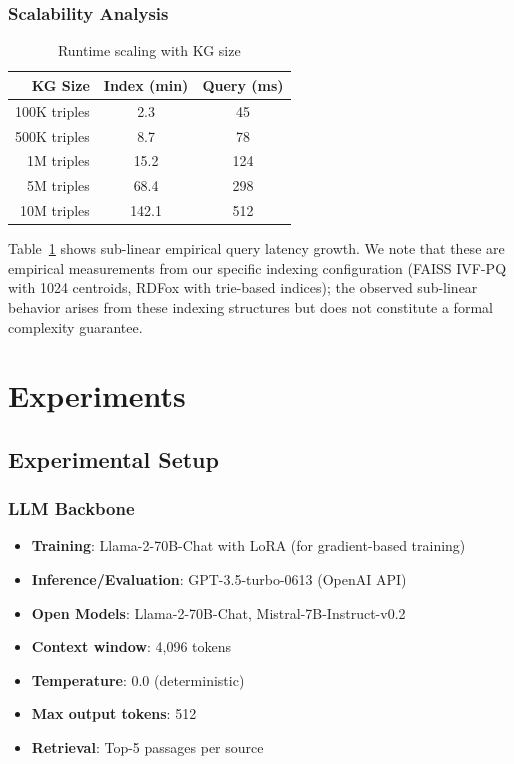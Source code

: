 \documentclass[10pt,twocolumn]{article}
\begin{document}
\subsubsection{Scalability Analysis}

\begin{table}[t]
\centering
\caption{Runtime scaling with KG size}
\label{tab:scale}
\small
\begin{tabular}{@{}rcc@{}}
\toprule
\textbf{KG Size} & \textbf{Index (min)} & \textbf{Query (ms)} \\
\midrule
100K triples & 2.3 & 45 \\
500K triples & 8.7 & 78 \\
1M triples & 15.2 & 124 \\
5M triples & 68.4 & 298 \\
10M triples & 142.1 & 512 \\
\bottomrule
\end{tabular}
\end{table}

Table~\ref{tab:scale} shows sub-linear empirical query latency growth. We note that these are empirical measurements from our specific indexing configuration (FAISS IVF-PQ with 1024 centroids, RDFox with trie-based indices); the observed sub-linear behavior arises from these indexing structures but does not constitute a formal complexity guarantee.

\section{Experiments}
\label{sec:experiments}

\subsection{Experimental Setup}

\subsubsection{LLM Backbone}
\begin{itemize}
    \item \textbf{Training}: Llama-2-70B-Chat with LoRA (for gradient-based training)
    \item \textbf{Inference/Evaluation}: GPT-3.5-turbo-0613 (OpenAI API)
    \item \textbf{Open Models}: Llama-2-70B-Chat, Mistral-7B-Instruct-v0.2
    \item \textbf{Context window}: 4,096 tokens
    \item \textbf{Temperature}: 0.0 (deterministic)
    \item \textbf{Max output tokens}: 512
    \item \textbf{Retrieval}: Top-5 passages per source
\end{itemize}
\end{document}
